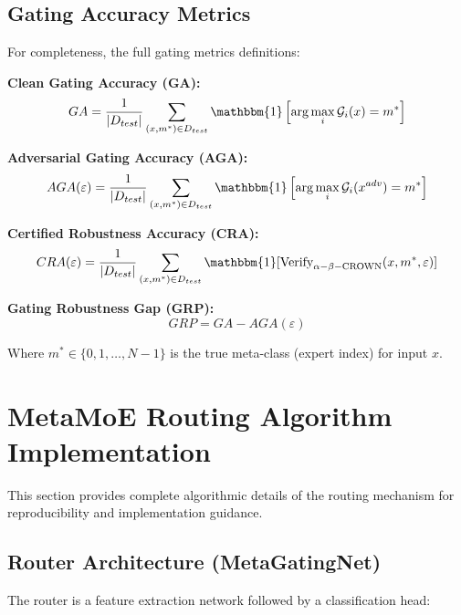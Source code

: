 \documentclass[11pt,a4paper]{article}
\begin{document}
\subsection{Gating Accuracy Metrics}

For completeness, the full gating metrics definitions:

\textbf{Clean Gating Accuracy (GA):}
\begin{equation}
    GA = \frac{1}{|D_{test}|} \sum_{(x,m^*) \in D_{test}} \mathbbm{1}\left[\arg\max_i \mathcal{G}_i(x) = m^*\right]
\end{equation}

\textbf{Adversarial Gating Accuracy (AGA):}
\begin{equation}
    AGA(\varepsilon) = \frac{1}{|D_{test}|} \sum_{(x,m^*) \in D_{test}} \mathbbm{1}\left[\arg\max_i \mathcal{G}_i(x^{adv}) = m^*\right]
\end{equation}

\textbf{Certified Robustness Accuracy (CRA):}
\begin{equation}
    CRA(\varepsilon) = \frac{1}{|D_{test}|} \sum_{(x,m^*) \in D_{test}} \mathbbm{1}[\text{Verify}_{\alpha-\beta-\text{CROWN}}(x, m^*, \varepsilon)]
\end{equation}

\textbf{Gating Robustness Gap (GRP):}
\begin{equation}
    GRP = GA - AGA(\varepsilon)
\end{equation}

Where $m^* \in \{0, 1, \ldots, N-1\}$ is the true meta-class (expert index) for input $x$.

\section{MetaMoE Routing Algorithm Implementation}

This section provides complete algorithmic details of the routing mechanism for reproducibility and implementation guidance.

\subsection{Router Architecture (MetaGatingNet)}

The router is a feature extraction network followed by a classification head:
\end{document}

